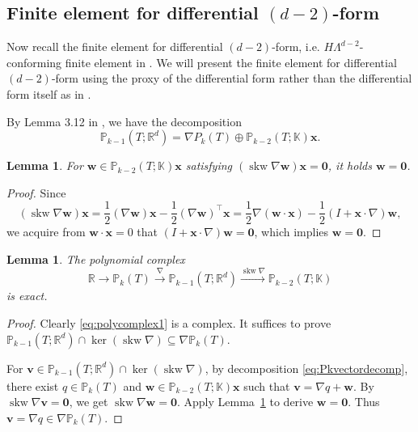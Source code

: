 \documentclass[10pt]{amsart}
\newtheorem{lemma}[theorem]{Lemma}
\newcommand{\skw}{\operatorname{skw}}
\numberwithin{equation}{section}
\begin{document}
\subsection{Finite element for differential $(d-2)$-form}
Now recall the finite element for differential $(d-2)$-form, i.e. $H\Lambda^{d-2}$-conforming finite element in \cite{ArnoldFalkWinther2006,Arnold2018}. We will present the finite element for differential $(d-2)$-form using the proxy of the differential form rather than the differential form itself as in \cite{ArnoldFalkWinther2006,Arnold2018}. 

By Lemma 3.12 in \cite{ChenHuang2021divdiv}, we have the decomposition
\begin{equation}\label{eq:Pkvectordecomp}  
\mathbb P_{k-1}(T;\mathbb R^{d})=\nabla P_k(T)\oplus\mathbb P_{k-2}(T;\mathbb K)\boldsymbol{x}.
\end{equation}

\begin{lemma}\label{lem:skwgrad}
For $\boldsymbol{w}\in\mathbb P_{k-2}(T;\mathbb K)\boldsymbol{x}$ satisfying $(\skw\nabla\boldsymbol{w})\boldsymbol{x}=\boldsymbol{0}$, it holds $\boldsymbol{w}=\boldsymbol{0}$.
\end{lemma}
\begin{proof}
Since
\begin{equation*}%
(\skw\nabla\boldsymbol{w})\boldsymbol{x}=\frac{1}{2}(\nabla\boldsymbol{w})\boldsymbol{x}-\frac{1}{2}(\nabla\boldsymbol{w})^{\intercal}\boldsymbol{x}=\frac{1}{2}\nabla(\boldsymbol{w}\cdot\boldsymbol{x})-\frac{1}{2}(I+\boldsymbol{x}\cdot\nabla)\boldsymbol{w},
\end{equation*}
we acquire from $\boldsymbol{w}\cdot\boldsymbol{x}=0$ that $(I+\boldsymbol{x}\cdot\nabla)\boldsymbol{w}=\boldsymbol{0}$, which implies $\boldsymbol{w}=\boldsymbol{0}$.
\end{proof}

\begin{lemma}
The polynomial complex
\begin{equation}\label{eq:polycomplex1}
\mathbb R\xrightarrow{}\mathbb P_k(T)\xrightarrow{\nabla}\mathbb P_{k-1}(T;\mathbb R^d)\xrightarrow{\skw\nabla}\mathbb P_{k-2}(T;\mathbb K)
\end{equation}
is exact.
\end{lemma}
\begin{proof}
Clearly \eqref{eq:polycomplex1} is a complex. It suffices to prove $\mathbb P_{k-1}(T;\mathbb R^d)\cap\ker(\skw\nabla)\subseteq\nabla\mathbb P_{k}(T)$.

For $\boldsymbol{v}\in\mathbb P_{k-1}(T;\mathbb R^d)\cap\ker(\skw\nabla)$, by decomposition \eqref{eq:Pkvectordecomp}, there exist $q\in \mathbb P_k(T)$ and $\boldsymbol{w}\in\mathbb P_{k-2}(T;\mathbb K)\boldsymbol{x}$ such that $\boldsymbol{v}=\nabla q+\boldsymbol{w}$. 
By $\skw\nabla\boldsymbol{v}=\boldsymbol{0}$, we get $\skw\nabla\boldsymbol{w}=\boldsymbol{0}$. 
Apply Lemma~\ref{lem:skwgrad} to derive $\boldsymbol{w}=\boldsymbol{0}$. Thus $\boldsymbol{v}=\nabla q\in\nabla\mathbb P_k(T)$.
\end{proof}
\end{document}
